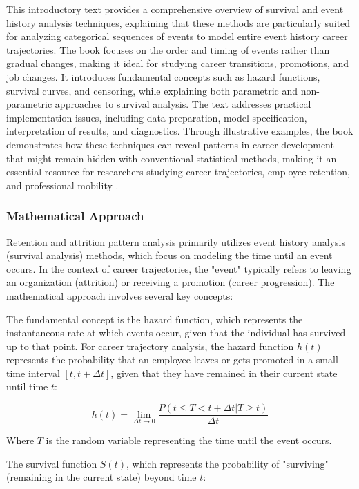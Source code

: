 \documentclass[../main.tex]{subfiles}
\begin{document}
This introductory text provides a comprehensive overview of survival and event history analysis techniques, explaining that these methods are particularly suited for analyzing categorical sequences of events to model entire event history career trajectories. The book focuses on the order and timing of events rather than gradual changes, making it ideal for studying career transitions, promotions, and job changes. It introduces fundamental concepts such as hazard functions, survival curves, and censoring, while explaining both parametric and non-parametric approaches to survival analysis. The text addresses practical implementation issues, including data preparation, model specification, interpretation of results, and diagnostics. Through illustrative examples, the book demonstrates how these techniques can reveal patterns in career development that might remain hidden with conventional statistical methods, making it an essential resource for researchers studying career trajectories, employee retention, and professional mobility \parencite{mills2011introducing}.

\subsubsection{Mathematical Approach}

Retention and attrition pattern analysis primarily utilizes event history analysis (survival analysis) methods, which focus on modeling the time until an event occurs. In the context of career trajectories, the "event" typically refers to leaving an organization (attrition) or receiving a promotion (career progression). The mathematical approach involves several key concepts:

The fundamental concept is the hazard function, which represents the instantaneous rate at which events occur, given that the individual has survived up to that point. For career trajectory analysis, the hazard function \(h(t)\) represents the probability that an employee leaves or gets promoted in a small time interval \([t, t+\Delta t]\), given that they have remained in their current state until time \(t\):

\[h(t) = \lim_{\Delta t \to 0} \frac{P(t \leq T < t+\Delta t | T \geq t)}{\Delta t}\]

Where \(T\) is the random variable representing the time until the event occurs.

The survival function \(S(t)\), which represents the probability of "surviving" (remaining in the current state) beyond time \(t\):
\end{document}
